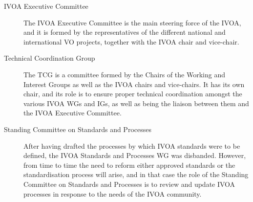 		\begin{description}
			
			\item[IVOA Executive Committee] The IVOA Executive
			Committee is the main steering force of the IVOA, and
			it is formed by the representatives of the different
			national and international VO projects, together with
			the IVOA chair and vice-chair.
			
			 \item[Technical Coordination Group] The TCG is a
			committee formed by the Chairs of the Working and
			Interest Groups as well as the IVOA chairs and
			vice-chairs. It has its own chair, and its role is to
			ensure proper technical coordination amongst the
			various IVOA WGs and IGs, as well as being the liaison
			between them and the IVOA Executive Committee.
			
			 \item[Standing Committee on Standards and Processes]
			After having drafted the processes by which IVOA
			standards were to be defined, the IVOA Standards and
			Processes WG was disbanded. However, from time to time
			the need to reform either approved standards or the
			standardisation process will arise, and in that case
			the role of the Standing Committee on Standards and
			Processes is to review and update IVOA processes in
			response to the needs of the IVOA community.
			
		\end{description}
	
	

